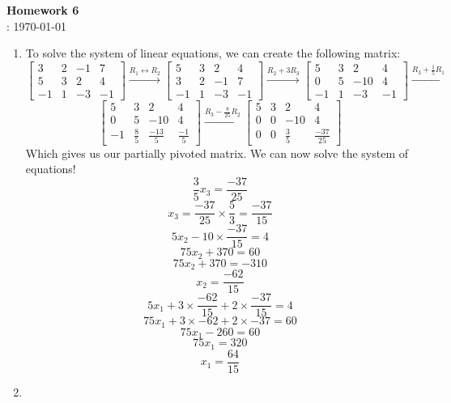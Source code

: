 \documentclass[12pt]{article}
\title{}
\author{Josh Morales}
\date{\today}
\begin{document}
\pagestyle{fancy}
\begin{center}
\textbf{\Large Homework 6} \\
: \today
\end{center}
\begin{enumerate}[leftmargin=2em]
    \item 
    To solve the system of linear equations, we can create the following matrix:
    \[
    \left[ \begin{array}{ccc|c}
        3 & 2 & -1 & 7 \\
        5 & 3 & 2 & 4 \\
        -1 & 1 & -3 & -1
    \end{array} \right]
    \xrightarrow{R_1 \leftrightarrow R_2}
    \left[ \begin{array}{ccc|c}
        5 & 3 & 2 & 4 \\
        3 & 2 & -1 & 7 \\
        -1 & 1 & -3 & -1
    \end{array} \right]
    \xrightarrow{R_2 + 3R_3}
    \left[ \begin{array}{ccc|c}
        5 & 3 & 2 & 4 \\
        0 & 5 & -10 & 4 \\
        -1 & 1 & -3 & -1
    \end{array} \right]
    \xrightarrow{R_3 + \frac{1}{5}R_1}
    \]
    \[
    \left[ \begin{array}{ccc|c}
        5 & 3 & 2 & 4 \\
        0 & 5 & -10 & 4 \\
        -1 & \frac{8}{5} & \frac{-13}{5} & \frac{-1}{5}
    \end{array} \right]
    \xrightarrow{R_3 - \frac{8}{25}R_2}
    \left[ \begin{array}{ccc|c}
        5 & 3 & 2 & 4 \\
        0 & 0 & -10 & 4 \\
        0 & 0 & \frac{3}{5} & \frac{-37}{25}
    \end{array} \right]
    \]
    Which gives us our partially pivoted matrix. We can now solve the system of equations! 
    \[\frac{3}{5}x_3 = \frac{-37}{25}\]
    \[x_3 = \frac{-37}{25}\times\frac{5}{3} = \frac{-37}{15}\]
    \[5x_2-10 \times \frac{-37}{15} = 4\]
    \[75x_2 + 370 = 60\]
    \[75x_2 + 370 = -310\]
    \[x_2 = \frac{-62}{15}\]
    \[5x_1 + 3 \times \frac{-62}{15} + 2 \times \frac{-37}{15} = 4\]
    \[75x_1 + 3 \times -62 + 2 \times -37 = 60\]
    \[75x_1 - 260 = 60\]
    \[75x_1 = 320\]
    \[x_1 = \frac{64}{15}\]
    \item


\end{enumerate}
\end{document}
